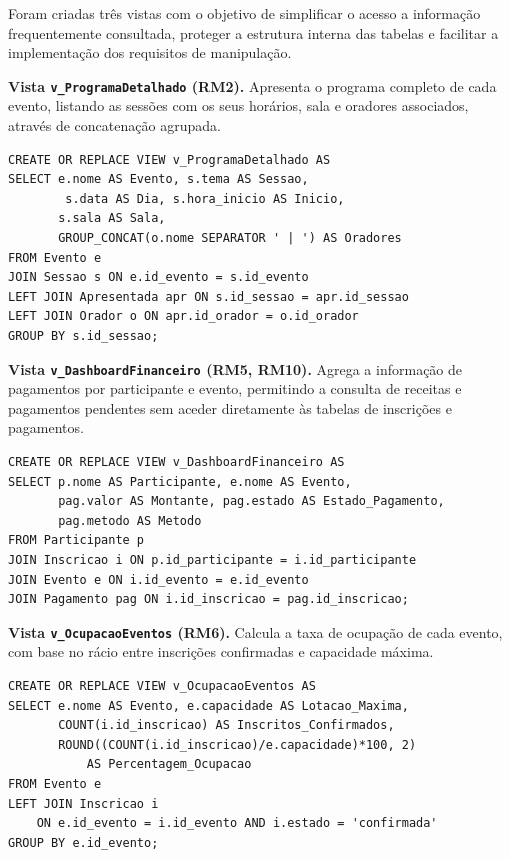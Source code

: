 \documentclass[runningheads]{llncs}
\begin{document}
                Foram criadas três vistas com o objetivo de simplificar o acesso a informação frequentemente consultada, proteger a estrutura interna das tabelas e facilitar a implementação dos requisitos de manipulação.

                \textbf{Vista \texttt{v\_ProgramaDetalhado} (RM2).} Apresenta o programa completo de cada evento, listando as sessões com os seus horários, sala e oradores associados, através de concatenação agrupada.

                \begin{verbatim}
CREATE OR REPLACE VIEW v_ProgramaDetalhado AS
SELECT e.nome AS Evento, s.tema AS Sessao,
        s.data AS Dia, s.hora_inicio AS Inicio,
       s.sala AS Sala,
       GROUP_CONCAT(o.nome SEPARATOR ' | ') AS Oradores
FROM Evento e
JOIN Sessao s ON e.id_evento = s.id_evento
LEFT JOIN Apresentada apr ON s.id_sessao = apr.id_sessao
LEFT JOIN Orador o ON apr.id_orador = o.id_orador
GROUP BY s.id_sessao;
                \end{verbatim}

                \textbf{Vista \texttt{v\_DashboardFinanceiro} (RM5, RM10).} Agrega a informação de pagamentos por participante e evento, permitindo a consulta de receitas e pagamentos pendentes sem aceder diretamente às tabelas de inscrições e pagamentos.

                \begin{verbatim}
CREATE OR REPLACE VIEW v_DashboardFinanceiro AS
SELECT p.nome AS Participante, e.nome AS Evento,
       pag.valor AS Montante, pag.estado AS Estado_Pagamento,
       pag.metodo AS Metodo
FROM Participante p
JOIN Inscricao i ON p.id_participante = i.id_participante
JOIN Evento e ON i.id_evento = e.id_evento
JOIN Pagamento pag ON i.id_inscricao = pag.id_inscricao;
                \end{verbatim}

                \textbf{Vista \texttt{v\_OcupacaoEventos} (RM6).} Calcula a taxa de ocupação de cada evento, com base no rácio entre inscrições confirmadas e capacidade máxima.

                \begin{verbatim}
CREATE OR REPLACE VIEW v_OcupacaoEventos AS
SELECT e.nome AS Evento, e.capacidade AS Lotacao_Maxima,
       COUNT(i.id_inscricao) AS Inscritos_Confirmados,
       ROUND((COUNT(i.id_inscricao)/e.capacidade)*100, 2)
           AS Percentagem_Ocupacao
FROM Evento e
LEFT JOIN Inscricao i
    ON e.id_evento = i.id_evento AND i.estado = 'confirmada'
GROUP BY e.id_evento;
                \end{verbatim}
\end{document}
